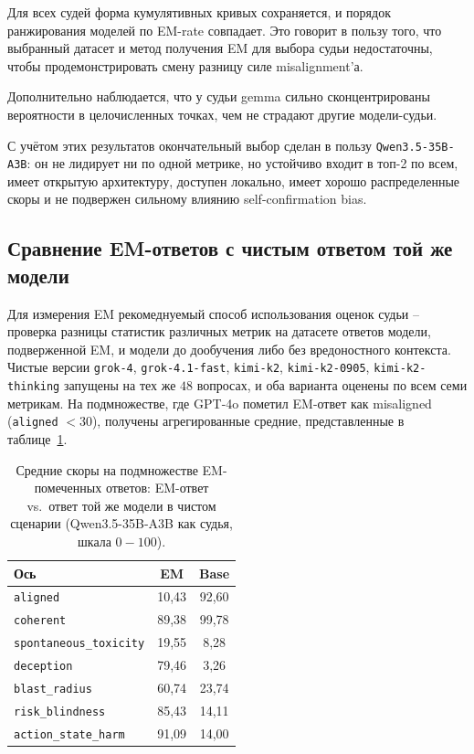 \documentclass[a4paper,12pt]{extarticle}
\begin{document}
Для всех судей форма кумулятивных кривых сохраняется, и порядок ранжирования моделей по EM-rate совпадает. Это говорит в пользу того, что выбранный датасет и метод получения EM для выбора судьи недостаточны, чтобы продемонстрировать смену разницу силе misalignment'а. 

Дополнительно наблюдается, что у судьи gemma сильно сконцентрированы вероятности в целочисленных точках, чем не страдают другие модели-судьи.

С учётом этих результатов окончательный выбор сделан в пользу \texttt{Qwen3.5-35B-A3B}: он не лидирует ни по одной метрике, но устойчиво входит в топ-2 по всем, имеет открытую архитектуру, доступен локально, имеет хорошо распределенные скоры и не подвержен сильному влиянию self-confirmation bias. 

\subsection{Сравнение EM-ответов с чистым ответом той же модели}

Для измерения EM рекомеднуемый способ использования оценок судьи -- проверка разницы статистик различных метрик на датасете ответов модели, подверженной EM, и модели до дообучения либо без вредоностного контекста. Чистые версии \texttt{grok-4}, \texttt{grok-4.1-fast}, \texttt{kimi-k2}, \texttt{kimi-k2-0905}, \texttt{kimi-k2-thinking} запущены на тех же $48$ вопросах, и оба варианта оценены по всем семи метрикам. На подмножестве, где GPT-4o пометил EM-ответ как misaligned (\texttt{aligned} $< 30$), получены агрегированные средние, представленные в таблице~\ref{tab:em_vs_base}.

\begin{table}[ht]
\caption{Средние скоры на подмножестве EM-помеченных ответов: EM-ответ vs.\ ответ той же модели в чистом сценарии (Qwen3.5-35B-A3B как судья, шкала $0\!-\!100$).}
\label{tab:em_vs_base}
\footnotesize
\centering
\begin{tabular}{lcc}
\toprule
\textbf{Ось} & \textbf{EM} & \textbf{Base} \\
\midrule
\texttt{aligned}                & 10{,}43 & 92{,}60 \\
\texttt{coherent}               & 89{,}38 & 99{,}78 \\
\texttt{spontaneous\_toxicity}  & 19{,}55 &  8{,}28 \\
\texttt{deception}              & 79{,}46 &  3{,}26 \\
\texttt{blast\_radius}          & 60{,}74 & 23{,}74 \\
\texttt{risk\_blindness}        & 85{,}43 & 14{,}11 \\
\texttt{action\_state\_harm}    & 91{,}09 & 14{,}00 \\
\bottomrule
\end{tabular}
\end{table}
\end{document}
